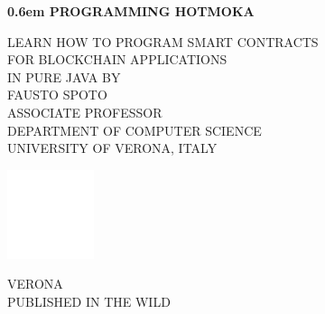 \documentclass[a4paper,]{book}
\begin{document}
\BgThispage
\newcommand\nbvspace[1][3]{\vspace*{\stretch{#1}}}
\newcommand\nbstretchyspace{\spaceskip0.5em plus 0.25em minus 0.25em}
\newcommand{\nbtitlestretch}{\spaceskip0.6em}
\pagestyle{empty}
\begin{center}
\bfseries
\nbvspace[1]
\Huge
{\nbtitlestretch\huge
PROGRAMMING HOTMOKA}

\nbvspace[1]
\normalsize

LEARN HOW TO PROGRAM SMART CONTRACTS\\
FOR BLOCKCHAIN APPLICATIONS\\
IN PURE JAVA
\nbvspace[1]
\small BY\\
\Large FAUSTO SPOTO\\[0.5em]
\footnotesize ASSOCIATE PROFESSOR\\
DEPARTMENT OF COMPUTER SCIENCE\\
UNIVERSITY OF VERONA, ITALY

\nbvspace[2]

\includegraphics[width=1in]{./pics/logo_minimal.png}
\nbvspace[3]
\normalsize

VERONA\\
\large
PUBLISHED IN THE WILD
\nbvspace[1]
\end{center}

\date{}
\end{document}
